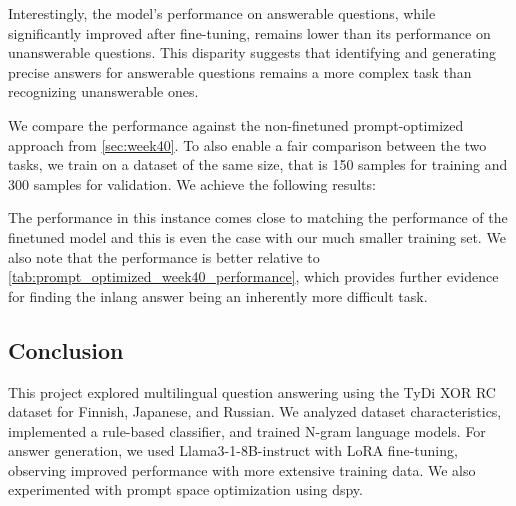 \documentclass[11pt]{article}
\begin{document}
Interestingly, the model's performance on answerable questions, while significantly improved after fine-tuning, remains lower than its performance on unanswerable questions. 
This disparity suggests that identifying and generating precise answers for answerable questions remains a more complex task than recognizing unanswerable ones.

We compare the performance against the non-finetuned prompt-optimized approach from \ref{sec:week40}.
To also enable a fair comparison between the two tasks, we train on a dataset of the same size, that is 150 samples for training and 300 samples for validation.
We achieve the following results:


\begin{table}[ht]
    \centering
    \caption{Performance comparison of F1 Score and Exact Match optimized models for QA on 'answer' field}
    \label{tab:prompt_optimized_week41_performance}
\end{table}

The performance in this instance comes close to matching the performance of the finetuned model and this is even the case with our much smaller training set.
We also note that the performance is better relative to \ref{tab:prompt_optimized_week40_performance}, which provides further evidence for finding the inlang answer being an inherently more difficult task.
\subsection{Conclusion}

This project explored multilingual question answering using the TyDi XOR RC dataset for Finnish, Japanese, and Russian. We analyzed dataset characteristics, implemented a rule-based classifier, and trained N-gram language models. For answer generation, we used Llama3-1-8B-instruct with LoRA fine-tuning, observing improved performance with more extensive training data. We also experimented with prompt space optimization using dspy.
\end{document}
